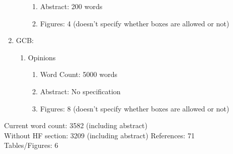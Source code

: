 \documentclass{article}\usepackage[]{graphicx}\usepackage[]{color}
\begin{document}
\begin{enumerate}
\begin{enumerate}
\begin{enumerate}
    \item Abstract: 200 words
    \item Figures: 4 (doesn't specify whether boxes are allowed or not)
    \end{enumerate}
  \end{enumerate}
  \item GCB:
  \begin{enumerate}
    \item Opinions
    \begin{enumerate}
    \item Word Count: 5000 words
    \item Abstract: No specification
    \item Figures: 8 (doesn't specify whether boxes are allowed or not)
    \end{enumerate}
  \end{enumerate}
\end{enumerate}

Current word count: 3582 (including abstract) \\
Without HF section: 3209 (including abstract)
References: 71 \\
Tables/Figures: 6 \\
\end{document}

